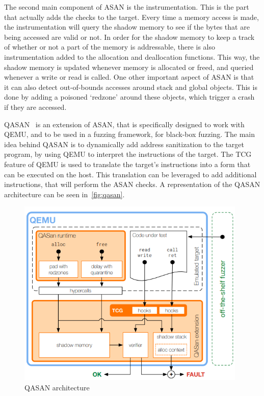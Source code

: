 The second main component of \ac{ASAN} is the instrumentation. This is the part that actually adds the checks to the
target. Every time a memory access is made, the instrumentation will query the shadow memory to see if the bytes that
are being accessed are valid or not. In order for the shadow memory to keep a track of whether or not a part of the
memory is addressable, there is also instrumentation added to the allocation and deallocation functions. This way, the
shadow memory is updated whenever memory is allocated or freed, and queried whenever a write or read is called. One other
important aspect of \ac{ASAN} is that it can also detect out-of-bounds accesses around stack and global objects. This is
done by adding a poisoned `redzone' around these objects, which trigger a crash if they are accessed.


\ac{QASAN}~\parencite{9230171} is an extension of \ac{ASAN}, that is specifically designed to work with QEMU, and to be used
in a fuzzing framework, for black-box fuzzing. The main idea behind \ac{QASAN} is to dynamically add address sanitization
to the target program, by using QEMU to interpret the instructions of the target. The \ac{TCG} feature of QEMU is used to
translate the target's instructions into a form that can be executed on the host. This translation can be leveraged to
add additional instructions, that will perform the \ac{ASAN} checks. A representation of the \ac{QASAN} architecture can be
seen in~\autoref{fig:qasan}.

\begin{figure}[htpb]
    \centering
    \includegraphics[height=90mm]{figures/qasan.png}
    \caption[QASAN]{\ac{QASAN} architecture~\parencite{9230171}}\label{fig:qasan}
\end{figure}


